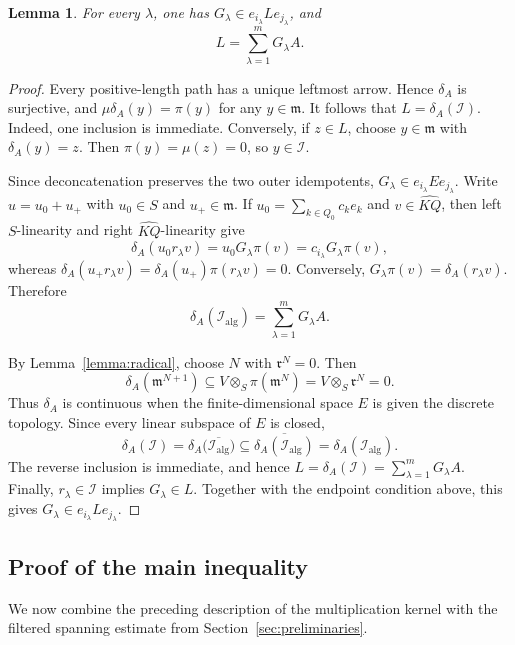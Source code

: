 \documentclass[11pt,letterpaper,reqno]{amsart}
\newtheorem{lemma}[lemma]{Lemma}
\theoremstyle{definition}
\newcommand{\m}{\mathfrak m}
\newcommand{\rA}{\mathfrak r}
\newcommand{\widehatKQ}{\widehat{KQ}}
\begin{document}
	\begin{lemma}
		\label{lemma:kernel-generators}
		For every $\lambda$, one has
		$G_\lambda\in e_{i_\lambda}Le_{j_\lambda}$, and
		\begin{equation*}
			L=\sum_{\lambda=1}^mG_\lambda A.
		\end{equation*}
	\end{lemma}
	
	\begin{proof}
		Every positive-length path has a unique leftmost arrow.  Hence $\delta_A$ is
		surjective, and $\mu\delta_A(y)=\pi(y)$ for any $y\in\m$.
		It follows that $L=\delta_A(\mathcal I)$. Indeed, one inclusion is immediate.  Conversely, if $z\in L$, choose
		$y\in\m$ with $\delta_A(y)=z$.  Then $\pi(y)=\mu(z)=0$, so
		$y\in\mathcal I$.
		
		Since deconcatenation preserves the two outer idempotents, $G_\lambda\in e_{i_\lambda}Ee_{j_\lambda}$. Write $u=u_0+u_+$ with $u_0\in S$ and $u_+\in\m$.  If
		$u_0=\sum_{k\in Q_0}c_ke_k$ and $v\in \widehatKQ$, then left $S$-linearity and right
		$\widehatKQ$-linearity give
		\[
		\delta_A(u_0r_\lambda v)
		=u_0G_\lambda\pi(v)
		=c_{i_\lambda}G_\lambda\pi(v),
		\]
		whereas $\delta_A(u_+r_\lambda v) =\delta_A(u_+)\pi(r_\lambda v)=0$. Conversely, $G_\lambda\pi(v)=\delta_A(r_\lambda v)$.  Therefore
		\[
		\delta_A(\mathcal I_{\mathrm{alg}})
		=\sum_{\lambda=1}^mG_\lambda A.
		\]
		
		By Lemma~\ref{lemma:radical}, choose $N$ with $\rA^N=0$.  Then
		\[
		\delta_A(\m^{N+1})
		\subseteq V\otimes_S\pi(\m^N)
		=V\otimes_S\rA^N
		=0.
		\]
		Thus $\delta_A$ is continuous when the finite-dimensional space $E$ is given
		the discrete topology.  Since every linear subspace of $E$ is closed,
		\[
		\delta_A(\mathcal I)
		=\delta_A\bigl(\overline{\mathcal I_{\mathrm{alg}}}\bigr)
		\subseteq
		\overline{\delta_A(\mathcal I_{\mathrm{alg}})}
		=\delta_A(\mathcal I_{\mathrm{alg}}).
		\]
		The reverse inclusion is immediate, and hence $L=\delta_A(\mathcal I) =\sum_{\lambda=1}^mG_\lambda A$. Finally, $r_\lambda\in\mathcal I$ implies $G_\lambda\in L$.  Together with
		the endpoint condition above, this gives $G_\lambda\in e_{i_\lambda}Le_{j_\lambda}$.
	\end{proof}
	
	\subsection{Proof of the main inequality}
	
	We now combine the preceding description of the multiplication kernel with
	the filtered spanning estimate from Section~\ref{sec:preliminaries}.
	
\end{document}
